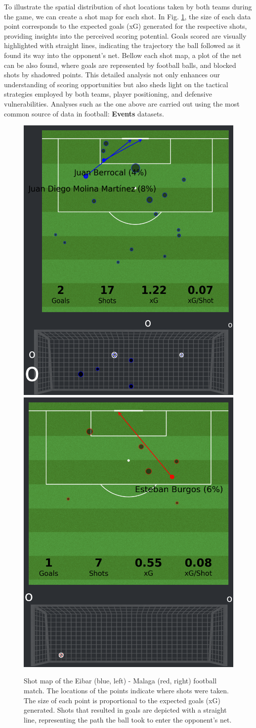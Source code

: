 \documentclass[
  twoside,nohyper]{book}
\begin{document}
To illustrate the spatial distribution of shot locations taken by both teams during the game, we can create a shot map for each shot. In Fig. \ref{fig:shotmap}, the size of each data point corresponds to the expected goals (xG) generated for the respective shots, providing insights into the perceived scoring potential. Goals scored are visually highlighted with straight lines, indicating the trajectory the ball followed as it found its way into the opponent's net. Bellow each shot map, a plot of the net can be also found, where goals are represented by football balls, and blocked shots by shadowed points. This detailed analysis not only enhances our understanding of scoring opportunities but also sheds light on the tactical strategies employed by both teams, player positioning, and defensive vulnerabilities. Analyses such as the one above are carried out using the most common
source of data in football: \textbf{Events} datasets.

\begin{figure}[H]

{\centering \includegraphics[width=0.45\linewidth,]{imagenes/home_shot_map} \includegraphics[width=0.45\linewidth,]{imagenes/away_shot_map} 

}

\caption{Shot map of the Eibar (blue, left) - Malaga (red, right) football match. The locations of the points indicate where shots were taken. The size of each point is proportional to the expected goals (xG) generated. Shots that resulted in goals are depicted with a straight line, representing the path the ball took to enter the opponent’s net.}\label{fig:shotmap}
\end{figure}
\end{document}

